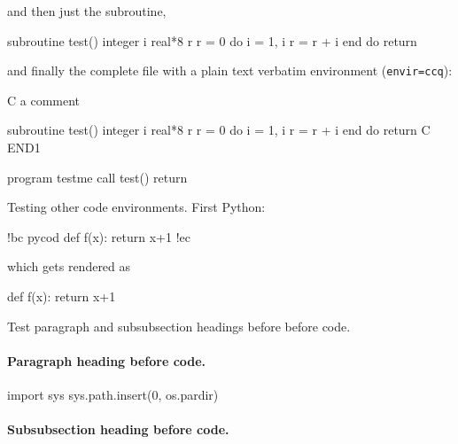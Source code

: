 \documentclass[%
oneside,                 %
final,                   %
10pt]{article}
\theoremstyle{definition}
\begin{document}
\efcod

and then just the subroutine,










\bfcod

      subroutine test()
      integer i
      real*8 r
      r = 0
      do i = 1, i
         r = r + i
      end do
      return

\efcod

and finally the complete file with a plain text verbatim environment
(\texttt{envir=ccq}):
















\bccq
C     a comment

      subroutine test()
      integer i
      real*8 r
      r = 0
      do i = 1, i
         r = r + i
      end do
      return
C     END1

      program testme
      call test()
      return

\eccq


Testing other code environments. First Python:






\bdo
!bc pycod
def f(x):
    return x+1
!ec

\edo

which gets rendered as




\bpycod
def f(x):
    return x+1

\epycod


Test paragraph and subsubsection headings before
before code.

\paragraph{Paragraph heading before code.}




\bpycod
import sys
sys.path.insert(0, os.pardir)

\epycod


\paragraph{Subsubsection heading before code.}
\end{document}
